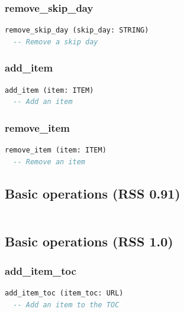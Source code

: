 \subsubsection{remove\_skip\_day}

\begin{lstlisting}[language=Eiffel]
remove_skip_day (skip_day: STRING)
  -- Remove a skip day
\end{lstlisting}

\subsubsection{add\_item}

\begin{lstlisting}[language=Eiffel]
add_item (item: ITEM)
  -- Add an item
\end{lstlisting}

\subsubsection{remove\_item}

\begin{lstlisting}[language=Eiffel]
remove_item (item: ITEM)
  -- Remove an item
\end{lstlisting}

\subsection{Basic operations (RSS 0.91)}
\label{sec:channel-basic-operations-rss091}

\subsubsection{}

\begin{lstlisting}[language=Eiffel]
\end{lstlisting}

\subsection{Basic operations (RSS 1.0)}
\label{sec:channel-basic-operations-rss10}

\subsubsection{add\_item\_toc}

\begin{lstlisting}[language=Eiffel]
add_item_toc (item_toc: URL)
  -- Add an item to the TOC  
\end{lstlisting}

